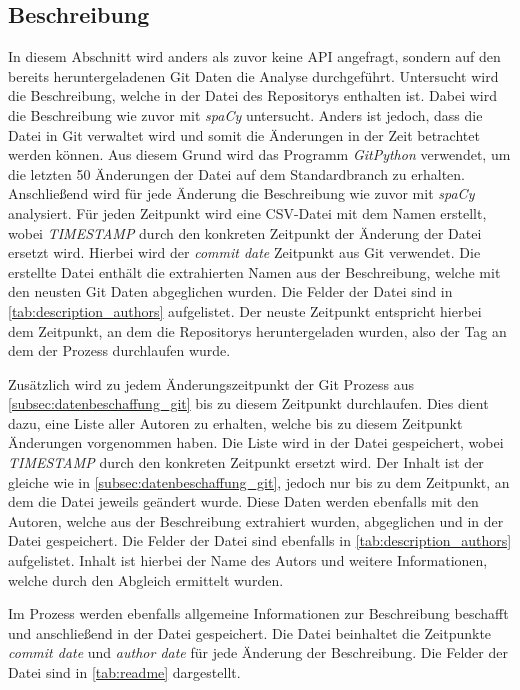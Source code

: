 \subsection{Beschreibung}
\label{subsec:datenbeschaffung_beschreibung}
In diesem Abschnitt wird anders als zuvor keine API angefragt, sondern auf den bereits heruntergeladenen Git Daten die Analyse durchgeführt.
Untersucht wird die Beschreibung, welche in der  Datei des Repositorys enthalten ist.
Dabei wird die Beschreibung wie zuvor mit \emph{spaCy} untersucht.
Anders ist jedoch, dass die  Datei in Git verwaltet wird und somit die Änderungen in der Zeit betrachtet werden können.
Aus diesem Grund wird das Programm \emph{GitPython} verwendet, um die letzten 50 Änderungen der Datei auf dem Standardbranch zu erhalten.
Anschließend wird für jede Änderung die Beschreibung wie zuvor mit \emph{spaCy} analysiert.
Für jeden Zeitpunkt wird eine CSV-Datei mit dem Namen  erstellt, wobei \emph{TIMESTAMP} durch den konkreten Zeitpunkt der Änderung der Datei ersetzt wird.
Hierbei wird der \emph{commit date} Zeitpunkt aus Git verwendet.
Die erstellte Datei enthält die extrahierten Namen aus der Beschreibung, welche mit den neusten Git Daten abgeglichen wurden.
Die Felder der Datei sind in \autoref{tab:description_authors} aufgelistet.
Der neuste Zeitpunkt entspricht hierbei dem Zeitpunkt, an dem die Repositorys heruntergeladen wurden, also der Tag an dem der Prozess durchlaufen wurde.

Zusätzlich wird zu jedem Änderungszeitpunkt der Git Prozess aus \autoref{subsec:datenbeschaffung_git} bis zu diesem Zeitpunkt durchlaufen.
Dies dient dazu, eine Liste aller Autoren zu erhalten, welche bis zu diesem Zeitpunkt Änderungen vorgenommen haben.
Die Liste wird in der Datei  gespeichert, wobei \emph{TIMESTAMP} durch den konkreten Zeitpunkt ersetzt wird.
Der Inhalt ist der gleiche wie in \autoref{subsec:datenbeschaffung_git}, jedoch nur bis zu dem Zeitpunkt, an dem die  Datei jeweils geändert wurde.
Diese Daten werden ebenfalls mit den Autoren, welche aus der Beschreibung extrahiert wurden, abgeglichen und in der Datei  gespeichert.
Die Felder der Datei sind ebenfalls in \autoref{tab:description_authors} aufgelistet.
Inhalt ist hierbei der Name des Autors und weitere Informationen, welche durch den Abgleich ermittelt wurden.

Im Prozess werden ebenfalls allgemeine Informationen zur Beschreibung beschafft und anschließend in der Datei  gespeichert.
Die Datei beinhaltet die Zeitpunkte \emph{commit date} und \emph{author date} für jede Änderung der Beschreibung.
Die Felder der Datei sind in \autoref{tab:readme} dargestellt.

